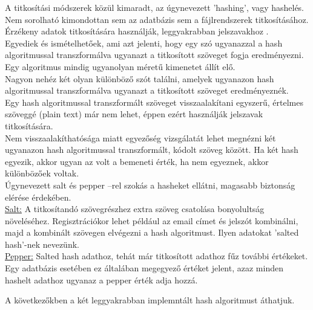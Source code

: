 A titkosítási módszerek közül kimaradt, az úgynevezett 'hashing', vagy hashelés. Nem sorolható kimondottan sem az adatbázis sem a fájlrendszerek titkosításához. 
\vspace{5pt} \\Érzékeny adatok titkosítására használják, leggyakrabban jelszavakhoz \cite{dang2008recommendation}.
\vspace{5pt} \\Egyediek és ismételhetőek, ami azt jelenti, hogy egy szó ugyanazzal a hash algoritmussal transzformálva ugyanazt a titkosított szöveget fogja eredményezni. 
\vspace{5pt} \\Egy algoritmus mindig ugyanolyan méretű kimenetet állít elő. 
\vspace{5pt} \\Nagyon nehéz két olyan különböző szót találni, amelyek ugyanazon hash algoritmussal transzformálva ugyanazt a titkosított szöveget eredményeznék.
\vspace{5pt} \\Egy hash algoritmussal transzformált szöveget visszaalakítani egyszerű, értelmes szöveggé (plain text) már nem lehet, éppen ezért használják jelszavak titkosítására.
\vspace{5pt} \\Nem visszaalakíthatósága miatt egyezőség vizsgálatát lehet megnézni két ugyanazon hash algoritmussal transzformált, kódolt szöveg között. Ha két hash egyezik, akkor ugyan az volt a bemeneti érték, ha nem egyeznek, akkor különbözőek voltak.
\vspace{5pt} \\Úgynevezett salt és pepper –rel szokás a hasheket ellátni, magasabb biztonság elérése érdekében.
\vspace{5pt} \\ \underline{Salt:} A titkosítandó szövegrészhez extra szöveg csatolása bonyolultság növeléséhez. Regisztrációkor lehet például az email címet és jelszót kombinálni, majd a kombinált szövegen elvégezni a hash algoritmust. Ilyen adatokat 'salted hash'-nek nevezünk.
\vspace{5pt} \\ \underline{Pepper:} Salted hash adathoz, tehát már titkosított adathoz fűz további értékeket. Egy adatbázis esetében ez általában megegyező értéket jelent, azaz minden hashelt adathoz ugyanaz a pepper érték adja hozzá.

A következőkben a két leggyakrabban implemntált hash algoritmust áthatjuk.

